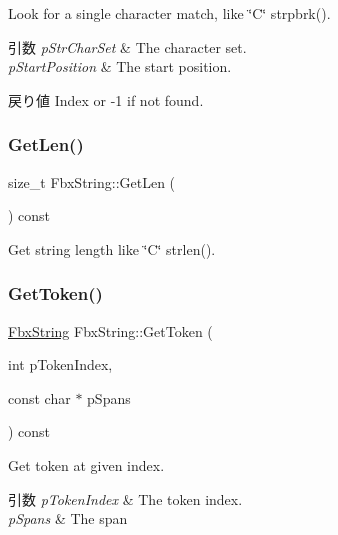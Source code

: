 Look for a single character match, like \char`\"{}\+C\char`\"{} strpbrk(). 
\begin{DoxyParams}{引数}
{\em p\+Str\+Char\+Set} & The character set. \\
\hline
{\em p\+Start\+Position} & The start position. \\
\hline
\end{DoxyParams}
\begin{DoxyReturn}{戻り値}
Index or -\/1 if not found. 
\end{DoxyReturn}
\mbox{\label{class_fbx_string_aeeead7b16201dd92aa3353c131f40c28}} 
\subsubsection{\texorpdfstring{Get\+Len()}{GetLen()}}
{\footnotesize\ttfamily size\+\_\+t Fbx\+String\+::\+Get\+Len (\begin{DoxyParamCaption}{ }\end{DoxyParamCaption}) const}



Get string length like \char`\"{}\+C\char`\"{} strlen(). 

\mbox{\label{class_fbx_string_a1836040bac11746d73e7c665216e0292}} 
\subsubsection{\texorpdfstring{Get\+Token()}{GetToken()}}
{\footnotesize\ttfamily \hyperlink{class_fbx_string}{Fbx\+String} Fbx\+String\+::\+Get\+Token (\begin{DoxyParamCaption}\item[{int}]{p\+Token\+Index,  }\item[{const char $\ast$}]{p\+Spans }\end{DoxyParamCaption}) const}

Get token at given index. 
\begin{DoxyParams}{引数}
{\em p\+Token\+Index} & The token index. \\
\hline
{\em p\+Spans} & The span \\
\hline
\end{DoxyParams}
\mbox{\label{class_fbx_string_a6ac1ce41710e19cf01a3db4f82fecbe0}} 
